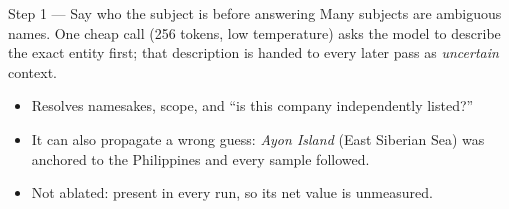 \documentclass[aspectratio=169,10pt]{beamer}
\newcommand{\rel}[1]{\texttt{#1}}
\begin{document}
\begin{frame}{Step 1 --- Say who the subject is before answering}
  Many subjects are ambiguous names. One cheap call (256 tokens, low
  temperature) asks the model to describe the exact entity first; that
  description is handed to every later pass as \emph{uncertain} context.

  \vspace{2mm}
  \begin{center}
  \end{center}

  \vspace{1mm}
  \begin{itemize}
    \item Resolves namesakes, scope, and ``is this company independently listed?''
    \item It can also propagate a wrong guess: \emph{Ayon Island} (East Siberian
      Sea) was anchored to the Philippines and every sample followed.
    \item \alert{Not ablated}: present in every run, so its net value is unmeasured.
  \end{itemize}
\end{frame}
\end{document}
